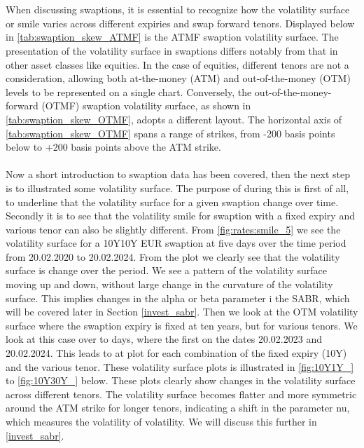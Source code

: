 \\\\
When discussing swaptions, it is essential to recognize how the volatility surface or smile varies across different expiries and swap 
forward tenors. Displayed below in \autoref{tab:swaption_skew_ATMF} is the ATMF swaption volatility surface. 
The presentation of the volatility surface in swaptions differs notably from that in other asset classes like equities. 
In the case of equities, different tenors are not a consideration, allowing both at-the-money (ATM) and out-of-the-money (OTM) 
levels to be represented on a single chart. Conversely, the out-of-the-money-forward (OTMF) swaption volatility surface, 
as shown in \autoref{tab:swaption_skew_OTMF}, adopts a different layout. The horizontal axis of 
\autoref{tab:swaption_skew_OTMF} spans a range of strikes, from -200 basis points below to +200 basis points above the ATM strike.
\\\\
Now a short introduction to swaption data has been covered, then the next step is to illustrated some 
volatility surface. The purpose of during this is first of all, to underline that the volatility surface for a 
given swaption change over time. Secondly it is to see that the volatility smile for swaption with a fixed
expiry and various tenor can also be slightly different.  From \autoref{fig:rates:smile_5} we see the volatility surface
for a 10Y10Y EUR swaption at five days over the time period from 20.02.2020 to 20.02.2024. From the plot 
we clearly see that the volatility surface is change over the period. We see a pattern of the volatility surface moving 
up and down, without large change in the curvature of the volatility surface. This implies changes in the alpha or beta parameter
i the SABR, which will be covered later in Section \ref{invest_sabr}. Then we look at the OTM volatility surface
where the swaption expiry is fixed at ten years, but for various tenors. We look at this case over to days, where the first 
on the dates 20.02.2023 and 20.02.2024. This leads to at plot for each combination of the fixed expiry (10Y) and the various tenor. 
These volatility surface plots is illustrated in \autoref{fig:10Y1Y_} to \autoref{fig:10Y30Y_} below.
These plots clearly show changes in the volatility surface across different tenors. 
The volatility surface becomes flatter and more symmetric around the ATM strike for longer tenors, 
indicating a shift in the parameter nu, which measures the volatility of volatility. We will discuss 
this further in \ref{invest_sabr}.
